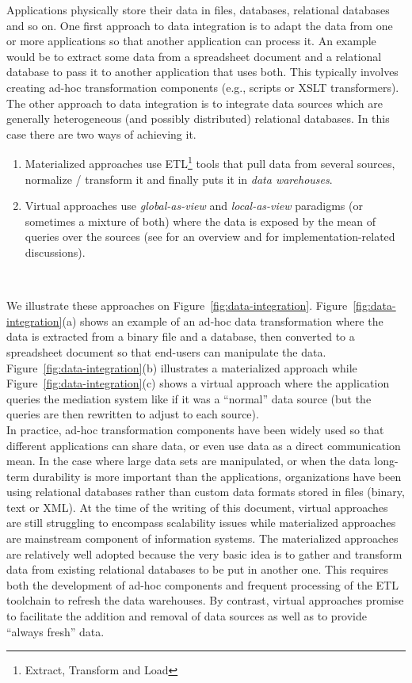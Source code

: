 Applications physically store their data in files, databases, relational databases and so on. One first approach to data integration is to adapt the data from one or more applications so that another application can process it. An example would be to extract some data from a spreadsheet document and a relational database to pass it to another application that uses both. This typically involves creating ad-hoc transformation components (e.g., scripts or XSLT transformers). The other approach to data integration is to integrate data sources which are generally heterogeneous (and possibly distributed) relational databases. In this case there are two ways of achieving it.
\begin{enumerate}

	\item Materialized approaches use ETL\footnote{Extract, Transform and Load} tools that pull data from several sources, normalize / transform it and finally puts it in \emph{data warehouses}.
	
	\item Virtual approaches use \emph{global-as-view} and \emph{local-as-view} paradigms (or sometimes a mixture of both) where the data is exposed by the mean of queries over the sources (see \cite{Ullman00,Lenzerini02} for an overview and \cite{ChawatheGHPUW94,LevyRO96,LattesR00,HalevyIMMST04} for implementation-related discussions).

\end{enumerate}\

We illustrate these approaches on Figure~\ref{fig:data-integration}. Figure~\ref{fig:data-integration}(a) shows an example of an ad-hoc data transformation where the data is extracted from a binary file and a database, then converted to a spreadsheet document so that end-users can manipulate the data. Figure~\ref{fig:data-integration}(b) illustrates a materialized approach while Figure~\ref{fig:data-integration}(c) shows a virtual approach where the application queries the mediation system like if it was a ``normal'' data source (but the queries are then rewritten to adjust to each source).\\

In practice, ad-hoc transformation components have been widely used so that different applications can share data, or even use data as a direct communication mean. In the case where large data sets are manipulated, or when the data long-term durability is more important than the applications, organizations have been using relational databases rather than custom data formats stored in files (binary, text or XML). At the time of the writing of this document, virtual approaches are still struggling to encompass scalability issues while materialized approaches are mainstream component of information systems. The materialized approaches are relatively well adopted because the very basic idea is to gather and transform data from existing relational databases to be put in another one. This requires both the development of ad-hoc components and frequent processing of the ETL toolchain to refresh the data warehouses. By contrast, virtual approaches promise to facilitate the addition and removal of data sources as well as to provide ``always fresh'' data.\\

